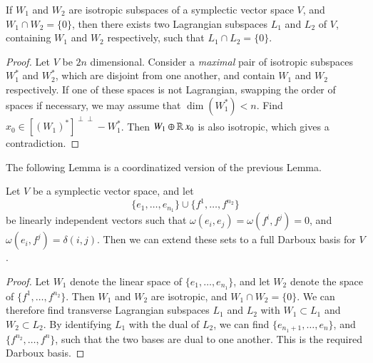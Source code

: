 \begin{lemma}
    If $W_1$ and $W_2$ are isotropic subspaces of a symplectic vector space $V$, and $W_1 \cap W_2 = \{ 0 \}$, then there exists two Lagrangian subspaces $L_1$ and $L_2$ of $V$, containing $W_1$ and $W_2$ respectively, such that $L_1 \cap L_2 = \{ 0 \}$.
\end{lemma}
\begin{proof}
    Let $V$ be $2n$ dimensional. Consider a \emph{maximal} pair of isotropic subspaces $W_1^*$ and $W_2^*$, which are disjoint from one another, and contain $W_1$ and $W_2$ respectively. If one of these spaces is not Lagrangian, swapping the order of spaces if necessary, we may assume that $\dim(W_1^*) < n$. Find $x_0 \in [(W_1)^*]^{\perp \perp} - W_1^*$. Then $W_1 \oplus \operatorname{\mathbb{R}} x_0$ is also isotropic, which gives a contradiction.
\end{proof}

The following Lemma is a coordinatized version of the previous Lemma.

\begin{lemma}
    Let $V$ be a symplectic vector space, and let
    \[ \{ e_1, \dots, e_{n_1} \} \cup \{ f^1, \dots, f^{n_2} \} \]
    be linearly independent vectors such that $\omega(e_i,e_j) = \omega(f^i,f^j) = 0$, and $\omega(e_i,f^j) = \delta(i,j)$. Then we can extend these sets to a full Darboux basis for $V$.
\end{lemma}
\begin{proof}
    Let $W_1$ denote the linear space of $\{ e_1, \dots, e_{n_1} \}$, and let $W_2$ denote the space of $\{ f^1, \dots, f^{n_2} \}$. Then $W_1$ and $W_2$ are isotropic, and $W_1 \cap W_2 = \{ 0 \}$. We can therefore find transverse Lagrangian subspaces $L_1$ and $L_2$ with $W_1 \subset L_1$ and $W_2 \subset L_2$. By identifying $L_1$ with the dual of $L_2$, we can find $\{ e_{n_1 + 1}, \dots, e_n \}$, and $\{ f^{n_2}, \dots, f^n \}$, such that the two bases are dual to one another. This is the required Darboux basis.
\end{proof}


